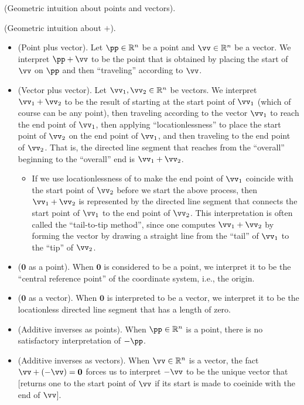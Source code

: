 \begin{remark}
    (Geometric intuition about points and vectors).
        
    (Geometric intuition about $+$).
    \begin{itemize}
        \item (Point plus vector). Let $\pp \in \R^n$ be a point and $\vv \in \R^n$ be a vector. We interpret $\pp + \vv$ to be the point that is obtained by placing the start of $\vv$ on $\pp$ and then ``traveling'' according to $\vv$.
        \item (Vector plus vector). Let $\vv_1, \vv_2 \in \R^n$ be vectors. We interpret $\vv_1 + \vv_2$ to be the result of starting at the start point of $\vv_1$ (which of course can be any point), then traveling according to the vector $\vv_1$ to reach the end point of $\vv_1$, then applying ``locationlessness'' to place the start point of $\vv_2$ on the end point of $\vv_1$, and then traveling to the end point of $\vv_2$. That is, the directed line segment that reaches from the ``overall'' beginning to the ``overall'' end is $\vv_1 + \vv_2$.
        \begin{itemize}
            \item If we use locationlessness of to make the end point of $\vv_1$ coincide with the start point of $\vv_2$ before we start the above process, then $\vv_1 + \vv_2$ is represented by the directed line segment that connects the start point of $\vv_1$ to the end point of $\vv_2$. This interpretation is often called the ``tail-to-tip method'', since one computes $\vv_1 + \vv_2$ by forming the vector by drawing a straight line from the “tail” of $\vv_1$ to the “tip” of $\vv_2$.
        \end{itemize}
        \item ($\mathbf{0}$ as a point). When $\mathbf{0}$ is considered to be a point, we interpret it to be the ``central reference point'' of the coordinate system, i.e., the origin.
        \item ($\mathbf{0}$ as a vector). When $\mathbf{0}$ is interpreted to be a vector, we interpret it to be the locationless directed line segment that has a length of zero.
        \item (Additive inverses as points). When $\pp \in \R^n$ is a point, there is no satisfactory interpretation of $-\pp$.
        \item (Additive inverses as vectors). When $\vv \in \R^n$ is a vector, the fact $\vv + (-\vv) = \mathbf{0}$ forces us to interpret $-\vv$ to be the unique vector that [returns one to the start point of $\vv$ if its start is made to coeinide with the end of $\vv$].
    \end{itemize}


\end{remark}
